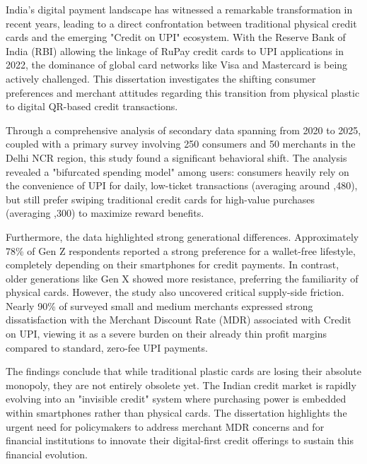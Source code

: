 
India's digital payment landscape has witnessed a remarkable transformation in recent years, leading to a direct confrontation between traditional physical credit cards and the emerging "Credit on UPI" ecosystem. With the Reserve Bank of India (RBI) allowing the linkage of RuPay credit cards to UPI applications in 2022, the dominance of global card networks like Visa and Mastercard is being actively challenged. This dissertation investigates the shifting consumer preferences and merchant attitudes regarding this transition from physical plastic to digital QR-based credit transactions.

Through a comprehensive analysis of secondary data spanning from 2020 to 2025, coupled with a primary survey involving 250 consumers and 50 merchants in the Delhi NCR region, this study found a significant behavioral shift. The analysis revealed a "bifurcated spending model" among users: consumers heavily rely on the convenience of UPI for daily, low-ticket transactions (averaging around ,480), but still prefer swiping traditional credit cards for high-value purchases (averaging ,300) to maximize reward benefits.

Furthermore, the data highlighted strong generational differences. Approximately 78\% of Gen Z respondents reported a strong preference for a wallet-free lifestyle, completely depending on their smartphones for credit payments. In contrast, older generations like Gen X showed more resistance, preferring the familiarity of physical cards. However, the study also uncovered critical supply-side friction. Nearly 90\% of surveyed small and medium merchants expressed strong dissatisfaction with the Merchant Discount Rate (MDR) associated with Credit on UPI, viewing it as a severe burden on their already thin profit margins compared to standard, zero-fee UPI payments.

The findings conclude that while traditional plastic cards are losing their absolute monopoly, they are not entirely obsolete yet. The Indian credit market is rapidly evolving into an "invisible credit" system where purchasing power is embedded within smartphones rather than physical cards. The dissertation highlights the urgent need for policymakers to address merchant MDR concerns and for financial institutions to innovate their digital-first credit offerings to sustain this financial evolution.